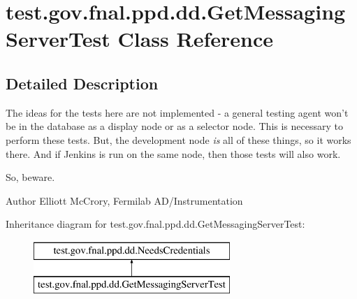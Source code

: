 \hypertarget{classtest_1_1gov_1_1fnal_1_1ppd_1_1dd_1_1GetMessagingServerTest}{\section{test.\-gov.\-fnal.\-ppd.\-dd.\-Get\-Messaging\-Server\-Test Class Reference}
\label{classtest_1_1gov_1_1fnal_1_1ppd_1_1dd_1_1GetMessagingServerTest}
}


\subsection{Detailed Description}
The ideas for the tests here are not implemented -\/ a general testing agent won't be in the database as a display node or as a selector node. This is necessary to perform these tests. But, the development node {\itshape is} all of these things, so it works there. And if Jenkins is run on the same node, then those tests will also work.

So, beware.

\begin{DoxyAuthor}{Author}
Elliott Mc\-Crory, Fermilab A\-D/\-Instrumentation 
\end{DoxyAuthor}
Inheritance diagram for test.\-gov.\-fnal.\-ppd.\-dd.\-Get\-Messaging\-Server\-Test\-:\begin{figure}[H]
\begin{center}
\leavevmode
\includegraphics[height=2.000000cm]{classtest_1_1gov_1_1fnal_1_1ppd_1_1dd_1_1GetMessagingServerTest}
\end{center}
\end{figure}
